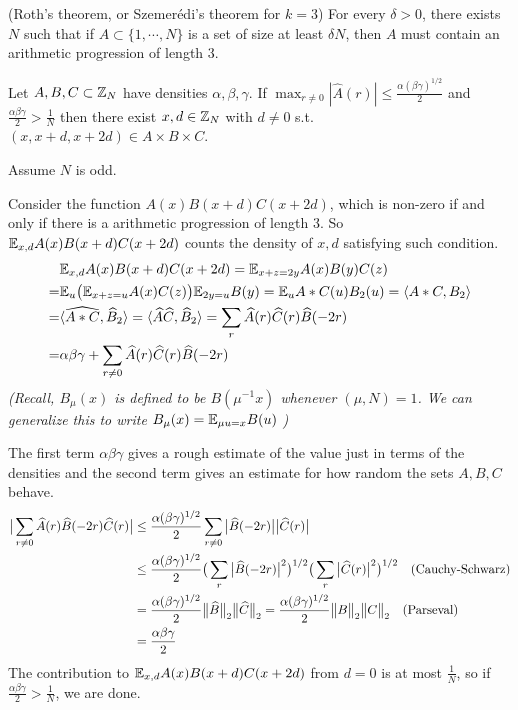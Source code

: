 \documentclass[10pt,a4paper]{report}
\renewcommand{\hat}{\widehat}
\newenvironment{proof}
{\begin{changemargin}{1cm}{0.5cm}
	}%
	{\end{changemargin}
}
\begin{document}
(Roth's theorem, or Szemer\'{e}di's theorem for $k=3$) For every $\delta >0$, there exists $N$ such that if $A \subset \{1, \cdots, N\}$ is a set of size at least $\delta N$, then $A$ must contain an arithmetic progression of length 3. 
\s

 Let $A,B,C \subset \mathbb{Z}_N$ have densities $\alpha,\beta,\gamma$. If $\max_{r\neq 0} |\hat{A}(r)| \leq \frac{\alpha(\beta \gamma)^{1/2}}{2}$ and $\frac{\alpha \beta \gamma}{2} > \frac{1}{N}$ then there exist $x, d \in \mathbb{Z}_N$ with $d\neq 0$ s.t. $(x,x+d,x+2d) \in A \times B \times C$.
\begin{proof}
\pf Assume $N$ is odd.

Consider the function $A(x)B(x+d)C(x+2d)$, which is non-zero if and only if there is a arithmetic progression of length 3. So $\mathbb{E}_{x,d} A(x)B(x+d)C(x+2d)$ counts the density of $x,d$ satisfying such condition.
\begin{align*}
& \avg_{x,d}A(x)B(x+d)C(x+2d) = \avg_{x+z =2y}A(x)B(y)C(z) \\
=& \avg_{u}\big( \avg_{x+z =u} A(x)C(z) \big) \avg_{2y=u} B(y) = \avg_u A * C(u) B_2(u) = \langle A * C, B_2 \rangle \\
=& \langle \hat{A*C}, \hat{B}_2 \rangle = \langle \hat{A} \hat{C}, \hat{B}_2 \rangle = \sum_r \hat{A}(r) \hat{C}(r) \hat{B}(-2r) \\
=& \alpha \beta \gamma + \sum_{r\neq 0} \hat{A}(r) \hat{C}(r) \hat{B}(-2r)
\end{align*}
\textit{(Recall, $B_{\mu}(x)$ is defined to be $B(\mu^{-1}x)$ whenever $(\mu, N)=1$. We can generalize this to write $B_{\mu}(x) = \mathbb{E}_{\mu u=x}B(u)$  )}

The first term $\alpha \beta \gamma$ gives a rough estimate of the value just in terms of the densities and the second term gives an estimate for how random the sets $A,B,C$ behave.
\begin{align*}
\big|\sum_{r\neq 0} \hat{A}(r) \hat{B}(-2r) \hat{C}(r) \big| &\leq \frac{\alpha (\beta \gamma)^{1/2}}{2} \sum_{r\neq 0} \big|\hat{B}(-2r)\big| \big|\hat{C}(r)\big| \\
&\leq \frac{\alpha (\beta \gamma)^{1/2}}{2} \big( \sum_r \big| \hat{B}(-2r) \big|^2 \big)^{1/2} \big( \sum_r \big| \hat{C}(r) \big|^2 \big)^{1/2} \quad \text{(Cauchy-Schwarz)} \\
& = \frac{\alpha (\beta \gamma)^{1/2}}{2} \norms{\hat{B}}{2} \norms{\hat{C}}{2} = \frac{\alpha (\beta \gamma)^{1/2}}{2} \norms{B}{2} \norms{C}{2} \quad \text{(Parseval)} \\
& = \frac{\alpha \beta \gamma}{2}
\end{align*}
The contribution to $\mathbb{E}_{x,d}A(x)B(x+d)C(x+2d)$ from $d=0$ is at most $\frac{1}{N}$, so if $\frac{\alpha \beta \gamma}{2} > \frac{1}{N}$, we are done.

\eop
\end{proof}
\s
\end{document}
